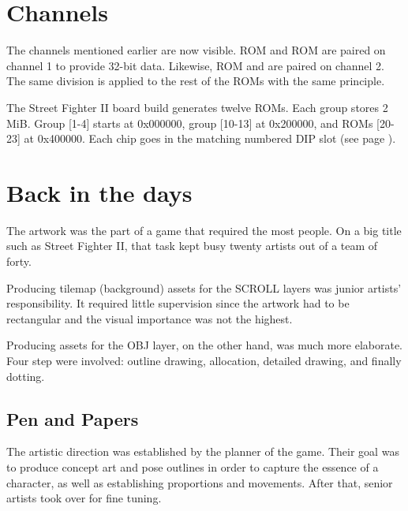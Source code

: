 
\section{Channels}\label{channels}
The channels mentioned earlier are now visible. ROM  and ROM  are paired on channel 1 to provide 32-bit data. Likewise, ROM  and  are paired on channel 2. The same division is applied to the rest of the ROMs with the same principle. 


The Street Fighter II board build generates twelve ROMs. Each group stores 2 MiB. Group [1-4] starts at 0x000000, group [10-13] at 0x200000, and ROMs [20-23] at 0x400000. Each chip goes in the matching numbered DIP slot (see page \pageref{boardb_no_chips}).










\section{Back in the days}

The artwork was the part of a game that required the most people. On a big title such as Street Fighter II, that task kept busy twenty artists out of a team of forty.

Producing tilemap (background) assets for the SCROLL layers was junior artists' responsibility. It required little supervision since the artwork had to be rectangular and the visual importance was not the highest.

Producing assets for the OBJ layer, on the other hand, was much more elaborate. Four step were involved: outline drawing, allocation, detailed drawing, and finally dotting.



\subsection{Pen and Papers}
The artistic direction was established by the planner of the game. Their goal was to produce concept art and pose outlines in order to capture the essence of a character, as well as establishing proportions and movements. After that, senior artists took over for fine tuning.

